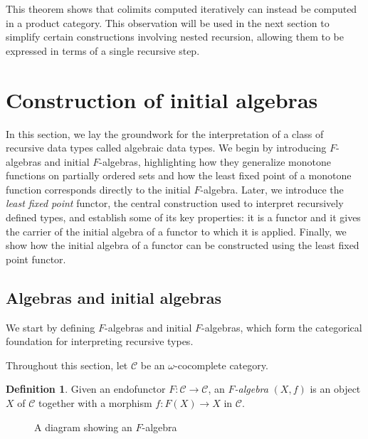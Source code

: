 \documentclass{msthesis}
\theoremstyle{definition}
\newtheorem{definition}[theorem]{Definition}
\newcommand{\mcC}{\mathcal{C}}
\begin{document}
This theorem shows that colimits computed iteratively can instead be computed in a product category. This observation will be used in the next section to simplify certain constructions involving nested recursion, allowing them to be expressed in terms of a single recursive step.

\section{Construction of initial algebras}\label{sec:constructinginitalg}

In this section, we lay the groundwork for the interpretation of a class of recursive data types called algebraic data types.  We begin by introducing $F$-algebras and initial $F$-algebras, highlighting how they generalize monotone functions on partially ordered sets and how the least fixed point of a monotone function corresponds directly to the initial $F$-algebra.  Later, we introduce the \emph{least fixed point} functor, the central construction used to interpret recursively defined types, and establish some of its key properties: it is a functor and it gives the carrier of the initial algebra of a functor to which it is applied.  Finally, we show how the initial algebra of a functor can be constructed using the least fixed point functor.

\subsection{Algebras and initial algebras}\label{sec:init_alg}
We start by defining $F$-algebras and initial $F$-algebras, which form the categorical foundation for interpreting recursive types.

Throughout this section, let $\mcC$ be an $\omega$-cocomplete category.

\begin{definition}
    Given an endofunctor $F : \mcC \to \mcC$, an \emph{$F$-algebra} $(X, f)$ is an object $X$ of $\mcC$ together with a morphism $f : F(X) \to X$ in $\mcC$.   
\end{definition}

\begin{figure}[htbp]
        \centering
        \caption{A diagram showing an $F$-algebra}
        \label{fig:falg}
\end{figure}
\end{document}
